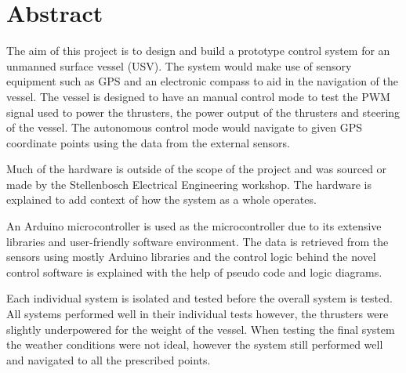 \chapter{Abstract}
The aim of this project is to design and build a prototype control system for an unmanned surface vessel (USV). The system would make use of sensory equipment such as GPS and an electronic compass to aid in the navigation of the vessel. The vessel is designed to have an manual control mode to test the PWM signal used to power the thrusters, the power output of the thrusters and steering of the vessel. The autonomous control mode would navigate to given GPS coordinate points using the data from the external sensors. \par
Much of the hardware is outside of the scope of the project and was sourced or made by the Stellenbosch Electrical Engineering workshop. The hardware is explained to add context of how the system as a whole operates.\par
An Arduino microcontroller is used as the microcontroller due to its extensive libraries and user-friendly software environment. The data is retrieved from the sensors using mostly Arduino libraries and the control logic behind the novel control software is explained with the help of pseudo code and logic diagrams.\par
Each individual system is isolated and tested before the overall system is tested. All systems performed well in their individual tests however, the thrusters were slightly underpowered for the weight of the vessel. When testing the final system the weather conditions were not ideal, however the system still performed well and navigated to all the prescribed points.
